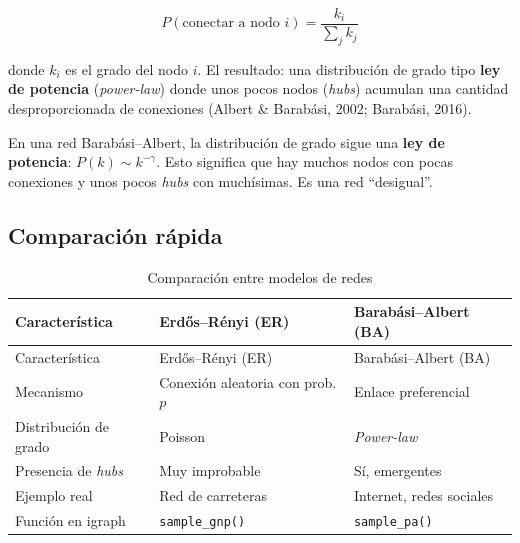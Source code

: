 \documentclass[
  letterpaper,
  DIV=11,
  numbers=noendperiod]{scrreprt}
\begin{document}
\[
P(\text{conectar a nodo } i) = \frac{k_i}{\sum_j k_j}
\]

donde \(k_i\) es el grado del nodo \(i\). El resultado: una distribución
de grado tipo \textbf{ley de potencia} (\emph{power-law}) donde unos
pocos nodos (\emph{hubs}) acumulan una cantidad desproporcionada de
conexiones (Albert \& Barabási, 2002; Barabási, 2016).

\begin{tcolorbox}[enhanced jigsaw, toprule=.15mm, colframe=quarto-callout-tip-color-frame, coltitle=black, titlerule=0mm, colback=white, breakable, leftrule=.75mm, arc=.35mm, bottomtitle=1mm, toptitle=1mm, rightrule=.15mm, bottomrule=.15mm, left=2mm, title=\textcolor{quarto-callout-tip-color}{\faLightbulb}\hspace{0.5em}{💡 Concepto clave}, colbacktitle=quarto-callout-tip-color!10!white, opacityback=0, opacitybacktitle=0.6]

En una red Barabási--Albert, la distribución de grado sigue una
\textbf{ley de potencia}: \(P(k) \sim k^{-\gamma}\). Esto significa que
hay muchos nodos con pocas conexiones y unos pocos \emph{hubs} con
muchísimas. Es una red ``desigual''.

\end{tcolorbox}

\subsection{Comparación rápida}\label{comparaciuxf3n-ruxe1pida}

\begin{longtable}[]{@{}lll@{}}
\caption{Comparación entre modelos de redes}\tabularnewline
\toprule\noalign{}
Característica & Erdős--Rényi (ER) & Barabási--Albert (BA) \\
\midrule\noalign{}
\endfirsthead
\toprule\noalign{}
Característica & Erdős--Rényi (ER) & Barabási--Albert (BA) \\
\midrule\noalign{}
\endhead
\bottomrule\noalign{}
\endlastfoot
Mecanismo & Conexión aleatoria con prob. \(p\) & Enlace preferencial \\
Distribución de grado & Poisson & \emph{Power-law} \\
Presencia de \emph{hubs} & Muy improbable & Sí, emergentes \\
Ejemplo real & Red de carreteras & Internet, redes sociales \\
Función en igraph & \texttt{sample\_gnp()} & \texttt{sample\_pa()} \\
\end{longtable}
\end{document}
